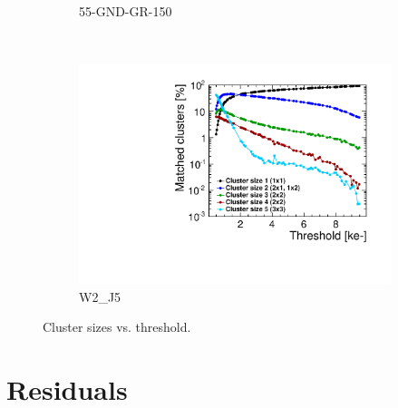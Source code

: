 \begin{figure}[htbp]
\begin{subfigure}[b]{0.33\textwidth}
    \caption{55-GND-GR-150}
  \end{subfigure}\\
  \begin{subfigure}[b]{0.33\textwidth}
    \includegraphics[width=\textwidth]{./figures/TestBeam/cluSize_THLscan_W0002_J05.pdf}
    \caption{W2\_J5}
  \end{subfigure}
  \caption{Cluster sizes vs. threshold.}
  \label{fig:clusterSize_vs_THLscan}
\end{figure}
\newpage
\section{Residuals}
